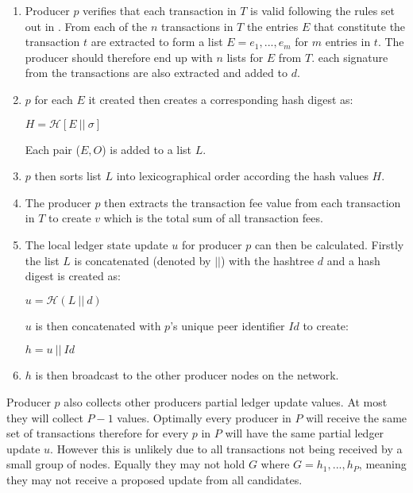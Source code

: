 \documentclass{article}
\begin{document}
\begin{enumerate}
\item Producer $p$ verifies that each transaction in $T$ is valid following the rules set out in \cite{transactionvalidator}. From each of the $n$ transactions in $T$ the entries $E$ that constitute the transaction $t$ are extracted to form a list $E = e_1,...,e_m$ for $m$ entries in $t$. The producer should therefore end up with $n$ lists for $E$ from $T$. each signature from the transactions are also extracted and added to $d$.

\item $p$ for each $E$ it created then creates a corresponding hash digest as:
\begin{center}
$H = \mathcal{H}[E~||~\sigma]$
\end{center}

Each pair ($E,O$) is added to a list $L$.

\item $p$ then sorts list $L$ into lexicographical order according the hash values $H$.

\item The producer $p$ then extracts the transaction fee value from each transaction in $T$ to create $v$ which is the total sum of all transaction fees.

\item The local ledger state update $u$ for producer $p$ can then be calculated. Firstly the list $L$ is concatenated (denoted by $||$) with the hashtree $d$ and a hash digest is created as:

\begin{center}
$u = \mathcal{H}(L~||~d)$
\end{center}

$u$ is then concatenated with $p$'s unique peer identifier $Id$ to create:

\begin{center}
$h = u ~||~Id$
\end{center}

\item $h$ is then broadcast to the other producer nodes on the network.
\end{enumerate}



Producer $p$ also collects other producers partial ledger update values. At most they will collect $P-1$ values. Optimally every producer in $P$ will receive the same set of transactions therefore for every $p$ in $P$ will have the same partial ledger update $u$. However this is unlikely due to all transactions not being received by a small group of nodes. Equally they may not hold $G$ where $G = h_1,...,h_P$, meaning they may not receive a proposed update from all candidates.
\end{document}
